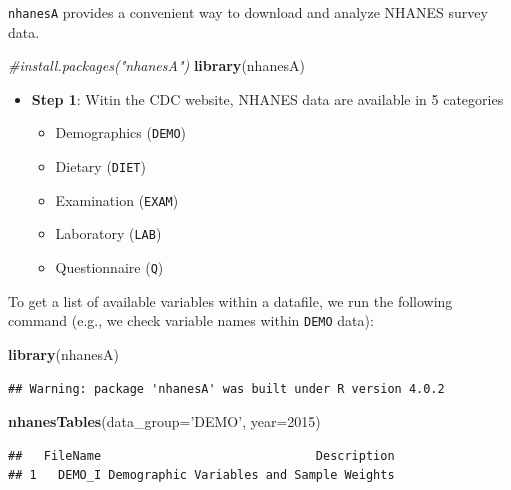 \documentclass[
]{book}
\newenvironment{Shaded}{\begin{snugshade}}{\end{snugshade}}
\newcommand{\CommentTok}[1]{\textcolor[rgb]{0.56,0.35,0.01}{\textit{#1}}}
\newcommand{\DataTypeTok}[1]{\textcolor[rgb]{0.13,0.29,0.53}{#1}}
\newcommand{\DecValTok}[1]{\textcolor[rgb]{0.00,0.00,0.81}{#1}}
\newcommand{\KeywordTok}[1]{\textcolor[rgb]{0.13,0.29,0.53}{\textbf{#1}}}
\newcommand{\NormalTok}[1]{#1}
\newcommand{\StringTok}[1]{\textcolor[rgb]{0.31,0.60,0.02}{#1}}
\providecommand{\tightlist}{%
  \setlength{\itemsep}{0pt}\setlength{\parskip}{0pt}}
\begin{document}
\texttt{nhanesA} provides a convenient way to download and analyze NHANES survey data.

\begin{Shaded}
\begin{Highlighting}[]
\CommentTok{#install.packages("nhanesA")}
\KeywordTok{library}\NormalTok{(nhanesA)}
\end{Highlighting}
\end{Shaded}

\begin{itemize}
\tightlist
\item
  \textbf{Step 1}: Witin the CDC website, NHANES data are available in 5 categories

  \begin{itemize}
  \tightlist
  \item
    Demographics (\texttt{DEMO})
  \item
    Dietary (\texttt{DIET})
  \item
    Examination (\texttt{EXAM})
  \item
    Laboratory (\texttt{LAB})
  \item
    Questionnaire (\texttt{Q})
  \end{itemize}
\end{itemize}

To get a list of available variables within a datafile, we run the following command (e.g., we check variable names within \texttt{DEMO} data):

\begin{Shaded}
\begin{Highlighting}[]
\KeywordTok{library}\NormalTok{(nhanesA)}
\end{Highlighting}
\end{Shaded}

\begin{verbatim}
## Warning: package 'nhanesA' was built under R version 4.0.2
\end{verbatim}

\begin{Shaded}
\begin{Highlighting}[]
\KeywordTok{nhanesTables}\NormalTok{(}\DataTypeTok{data_group=}\StringTok{'DEMO'}\NormalTok{, }\DataTypeTok{year=}\DecValTok{2015}\NormalTok{)}
\end{Highlighting}
\end{Shaded}

\begin{verbatim}
##   FileName                              Description
## 1   DEMO_I Demographic Variables and Sample Weights
\end{verbatim}
\end{document}

